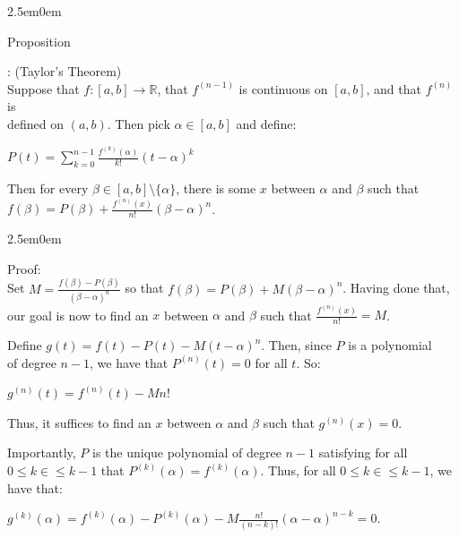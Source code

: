\documentclass{book}
\newcommand{\hTwo}{%
   \color{MidnightBlue}%
   \fontsize{13}{15}\selectfont%
}
\newcommand{\hThree}{%
   \color{PineGreen!85!Orange}
   \fontsize{13}{15}\selectfont%
}
\newenvironment{myIndent}{%
   \begin{adjustwidth}{2.5em}{0em}%
}{%
   \end{adjustwidth}%
}
\newcounter{PropNumber}
\newcommand{\propCount}[1][1]{%
   \addtocounter{PropNumber}{#1}%
   \thePropNumber%
}
\newcommand{\retTwo}{\hfill\bigbreak}
\begin{document}
{\begin{myIndent}\hTwo
   Proposition \propCount: (Taylor's Theorem)\\
   Suppose that $f: [a, b] \longrightarrow \mathbb{R}$, that $f^{(n-1)}$ is continuous on $[a, b]$, and that $f^{(n)}$ is\\ defined on $(a, b)$. Then pick $\alpha \in [a, b]$ and define:

   {\centering $P(t) = \sum\limits_{k=0}^{n-1}\frac{f^{(k)}(\alpha)}{k!}(t - \alpha)^k$\retTwo\par}

   Then for every $\beta \in [a, b] \setminus \{\alpha\}$, there is some $x$ between $\alpha$ and $\beta$ such that\\ $f(\beta) = P(\beta) + \frac{f^{(n)}(x)}{n!}(\beta - \alpha)^n$.\\ [-6pt]

   {\begin{myIndent}\hThree
      Proof:\\
      Set $M = \frac{f(\beta) - P(\beta)}{(\beta - \alpha)^n}$ so that $f(\beta) = P(\beta) + M(\beta - \alpha)^n$. Having done that,\\ [-5pt] our goal is now to find an $x$ between $\alpha$ and $\beta$ such that $\frac{f^{(n)}(x)}{n!} = M$. \retTwo

      Define $g(t) = f(t) - P(t) - M(t - \alpha)^n$. Then, since $P$ is a polynomial\\ of degree $n - 1$, we have that $P^{(n)}(t) = 0$ for all $t$. So:
      
      {\centering $g^{(n)}(t) = f^{(n)}(t) - Mn!$\retTwo\par}

      Thus, it suffices to find an $x$ between $\alpha$ and $\beta$ such that $g^{(n)}(x) = 0$.\retTwo

      Importantly, $P$ is the unique polynomial of degree $n - 1$ satisfying for all\\ $0 \leq k \in \leq k-1$ that $P^{(k)}(\alpha) = f^{(k)}(\alpha)$. Thus, for all $0 \leq k \in \leq k-1$, we\\ have that:
      
      {\centering$g^{(k)}(\alpha) = f^{(k)}(\alpha) - P^{(k)}(\alpha) - M\frac{n!}{(n-k)!}(\alpha - \alpha)^{n-k} = 0$.\retTwo\par}
      

\end{myIndent}}
\end{myIndent}}
\end{document}
